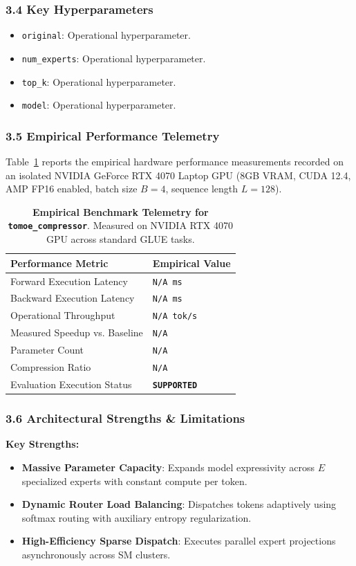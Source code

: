 \subsubsection*{3.4 Key Hyperparameters}
\begin{itemize}
    \item \texttt{original}: Operational hyperparameter.
    \item \texttt{num\_experts}: Operational hyperparameter.
    \item \texttt{top\_k}: Operational hyperparameter.
    \item \texttt{model}: Operational hyperparameter.
\end{itemize}

\subsubsection*{3.5 Empirical Performance Telemetry}
Table~\ref{tab:telemetry_tomoe_compressor} reports the empirical hardware performance measurements recorded on an isolated NVIDIA GeForce RTX 4070 Laptop GPU (8GB VRAM, CUDA 12.4, AMP FP16 enabled, batch size $B=4$, sequence length $L=128$).

\begin{table}[h]
\centering
\small
\caption{\textbf{Empirical Benchmark Telemetry for \texttt{tomoe\_compressor}}. Measured on NVIDIA RTX 4070 GPU across standard GLUE tasks.}
\label{tab:telemetry_tomoe_compressor}
\begin{tabularx}{\columnwidth}{lX}
\toprule
\textbf{Performance Metric} & \textbf{Empirical Value} \\
\midrule
Forward Execution Latency & \texttt{N/A ms} \\
Backward Execution Latency & \texttt{N/A ms} \\
Operational Throughput & \texttt{N/A tok/s} \\
Measured Speedup vs. Baseline & \texttt{N/A} \\
Parameter Count & \texttt{N/A} \\
Compression Ratio & \texttt{N/A} \\
Evaluation Execution Status & \textbf{\texttt{SUPPORTED}} \\
\bottomrule
\end{tabularx}
\end{table}

\subsubsection*{3.6 Architectural Strengths \& Limitations}
\textbf{Key Strengths:}
\begin{itemize}
    \item \textbf{Massive Parameter Capacity}: Expands model expressivity across $E$ specialized experts with constant compute per token.
    \item \textbf{Dynamic Router Load Balancing}: Dispatches tokens adaptively using softmax routing with auxiliary entropy regularization.
    \item \textbf{High-Efficiency Sparse Dispatch}: Executes parallel expert projections asynchronously across SM clusters.
\end{itemize}

